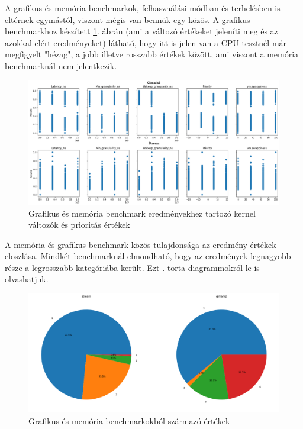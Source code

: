 A grafikus és memória benchmarkok, felhasználási módban és terhelésben is eltérnek egymástól, viszont mégis van bennük egy közös.
A grafikus benchmarkhoz készített \ref{fig:GraphicsAndMemoryParameters}. ábrán (ami a változó értékeket jeleníti meg és az azokkal elért eredményeket) látható, hogy itt is jelen van a CPU tesztnél már megfigyelt "hézag", a jobb illetve rosszabb értékek között, ami viszont a memória benchmarknál nem jelentkezik.

\begin{figure}[h!]
\centering
\includegraphics[scale=0.35]{images/graphicsAndMemoryBenchmarkValue.png}
\caption{Grafikus és memória benchmark eredményekhez tartozó kernel változók és prioritás értékek}
\label{fig:GraphicsAndMemoryParameters}
\end{figure}

A memória és grafikus benchmark közös tulajdonsága az eredmény értékek eloszlása. Mindkét benchmarknál elmondható, hogy az eredmények legnagyobb része a legrosszabb kategóriába került.
Ezt . torta diagrammokról le is olvashatjuk.

\begin{figure}[h!]
\centering
\includegraphics[width=\textwidth]{images/graphicsAndMemoryBenchmarkChart.png}
\caption{Grafikus és memória benchmarkokból származó értékek}
\label{fig:GraphicsAndMemoryChart}
\end{figure}


